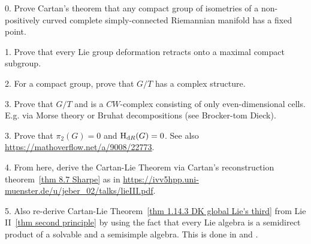 
0. Prove Cartan's theorem that any compact group of isometries of a non-positively curved complete simply-connected Riemannian manifold has a fixed point.

1. Prove that every Lie group deformation retracts onto a maximal compact subgroup.

2. For a compact group, prove that $G/T$ has a complex structure.

3. Prove that $G/T$ and is a $CW$-complex consisting of only even-dimensional cells. E.g. via Morse theory or Bruhat decompositions (see Brocker-tom Dieck).

3. Prove that $\pi_2(G)=0$ and $\mathrm{H}_{\mathrm dR}(G)=0$. See also \url{https://mathoverflow.net/a/9008/22773}.

4. From here, derive the Cartan-Lie Theorem via Cartan's reconstruction theorem~\ref{thm 8.7 Sharpe} as in \url{https://ivv5hpp.uni-muenster.de/u/jeber_02/talks/lieIII.pdf}. 

5. Also re-derive Cartan-Lie Theorem~\ref{thm 1.14.3 DK global Lie's third} from Lie II~\ref{thm second principle} by using the fact that every Lie algebra is a semidirect product of a solvable and a semisimple algebra. This is done in \cite[Rem.~9.5.12]{HN} and \cite{Borcherds}.


